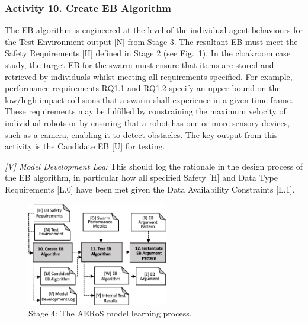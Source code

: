 \documentclass[runningheads]{llncs}
\begin{document}
\subsubsection*{Activity 10. Create EB Algorithm}

The EB algorithm is engineered at the level of the individual agent behaviours for the Test Environment output [N] from Stage 3. The resultant EB must meet the Safety Requirements [H] defined in Stage 2 (see Fig.~\ref{amlas-a-stage4}). 
In the cloakroom case study, the target EB for the swarm must ensure that items are stored and retrieved by individuals whilst meeting all requirements specified. For example, performance requirements RQ1.1 and RQ1.2 specify an upper bound on the low/high-impact collisions that a swarm shall experience in a given time frame. 
These requirements may be fulfilled by constraining the maximum velocity of individual robots or by ensuring that a robot has one or more sensory devices, such as a camera, enabling it to detect obstacles. 
The key output from this activity is the Candidate EB [U] for testing.

\emph{[V] Model Development Log:} This should log the rationale in the design process of the EB algorithm, in particular how all specified Safety [H] and Data Type Requirements [L.0] have been met given the Data Availability Constraints [L.1].

\begin{figure}[!t]
	\centering
	\includegraphics[width=0.55\textwidth]{figures/AERoS-Stage4.png}%
	\vspace{-2ex}
	\caption{Stage 4: The AERoS model learning process.}
	\label{amlas-a-stage4}
	\vspace{-4ex}
\end{figure}
\end{document}
